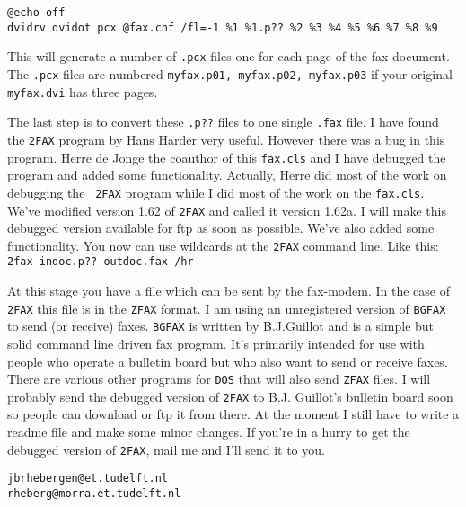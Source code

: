 \documentclass[oldtoc,a4paper,10pt]{artikel3}
\begin{document}
\begin{verbatim}
@echo off
dvidrv dvidot pcx @fax.cnf /fl=-1 %1 %1.p?? %2 %3 %4 %5 %6 %7 %8 %9
\end{verbatim}

This will generate a number of {\tt .pcx} files one for each page of the
fax document. The {\tt .pcx} files are numbered {\tt myfax.p01, myfax.p02,
myfax.p03} if your original {\tt myfax.dvi} has three pages.

The last step is to convert these {\tt .p??} files to one single {\tt .fax}
file. I have found the {\tt 2FAX} program by Hans Harder very useful.
However there was a bug in this program. Herre de Jonge the co\-author of
this {\tt fax.cls} and I have debugged the program and added some
functionality. Actually, Herre did most of the work on debugging the {\tt
2FAX} program while I did most of the work on the {\tt fax.cls}. We've
modified version 1.62 of {\tt 2FAX} and called it version 1.62a. I will
make this debugged version available for ftp as soon as possible. We've
also added some functionality. You now can use wildcards at the {\tt 2FAX}
command line. Like this: \verb|2fax indoc.p?? outdoc.fax /hr|

At this stage you have a file which can be sent by the fax-modem. In the
case of {\tt 2FAX} this file is in the {\tt ZFAX} format. I am using an
unregistered version of {\tt BGFAX} to send (or receive) faxes. {\tt BGFAX}
is written by B.J.Guillot and is a simple but solid command line driven fax
program. It's primarily intended for use with people who operate a bulletin
board but who also want to send or receive faxes. There are various other
programs for {\tt DOS} that will also send {\tt ZFAX} files. I will
probably send the debugged version of {\tt 2FAX} to B.J. Guillot's bulletin
board soon so people can download or ftp it from there. At the moment I
still have to write a readme file and make some minor changes. If you're in
a hurry to get the debugged version of {\tt 2FAX}, mail me and I'll send it
to you.

{\tt jbrhebergen@et.tudelft.nl}\\
{\tt rheberg@morra.et.tudelft.nl}
\end{document}
